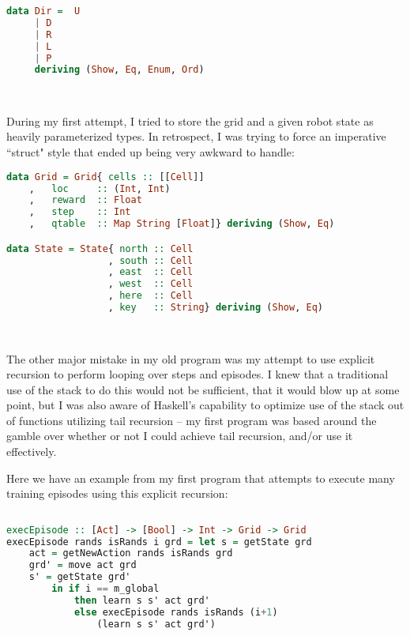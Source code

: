 \documentclass[12pt,a4paper]{article}
\begin{document}
		\begin{lstlisting}[language=Haskell]
data Dir =  U
	 | D
	 | R
	 | L
	 | P
	 deriving (Show, Eq, Enum, Ord)
		\end{lstlisting}\ \\
		
		\par During my first attempt, I tried to store the grid and a given robot state as heavily parameterized types. In retrospect, I was trying to force an imperative ``struct" style that ended up being very awkward to handle:\\
		\begin{lstlisting}[language=Haskell]
data Grid = Grid{ cells :: [[Cell]]
	,   loc     :: (Int, Int)
	,   reward  :: Float
	,   step    :: Int
	,   qtable  :: Map String [Float]} deriving (Show, Eq)

data State = State{ north :: Cell
                  , south :: Cell
                  , east  :: Cell
                  , west  :: Cell
                  , here  :: Cell
                  , key   :: String} deriving (Show, Eq)

		\end{lstlisting}\ \\
		
		\par The other major mistake in my old program was my attempt to use explicit recursion to perform looping over steps and episodes. I knew that a traditional use of the stack to do this would not be sufficient, that it would blow up at some point, but I was also aware of Haskell's capability to optimize use of the stack out of functions utilizing tail recursion -- my first program was based around the gamble over whether or not I could achieve tail recursion, and/or use it effectively.
		\par Here we have an example from my first program that attempts to execute many training episodes using this explicit recursion:
		
		\begin{lstlisting}[language=Haskell]
		
execEpisode :: [Act] -> [Bool] -> Int -> Grid -> Grid
execEpisode rands isRands i grd = let s = getState grd
	act = getNewAction rands isRands grd
	grd' = move act grd
	s' = getState grd'
		in if i == m_global
			then learn s s' act grd'
			else execEpisode rands isRands (i+1) 
				(learn s s' act grd')

		\end{lstlisting}\ \\
		
\end{document}
